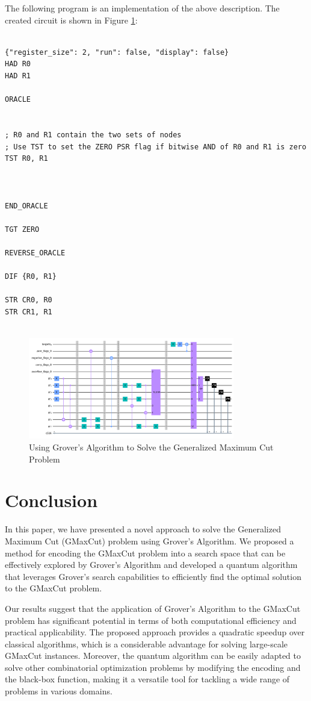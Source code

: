 The following program is an implementation of the above description. The created circuit is shown in Figure \ref{fig:Generalized_Maximum_Cut}:

\begin{lstlisting}

{"register_size": 2, "run": false, "display": false}
HAD R0
HAD R1

ORACLE


; R0 and R1 contain the two sets of nodes
; Use TST to set the ZERO PSR flag if bitwise AND of R0 and R1 is zero
TST R0, R1



END_ORACLE

TGT ZERO

REVERSE_ORACLE

DIF {R0, R1}

STR CR0, R0
STR CR1, R1


\end{lstlisting}

\begin{figure}[htp]
    \centering
    \includegraphics[width=9cm]{Figures/Generalized_Maximum_Cut_circuit.png}
    \caption{Using Grover's Algorithm to Solve the Generalized Maximum Cut Problem}
    \label{fig:Generalized_Maximum_Cut}
\end{figure}

\section{Conclusion}

In this paper, we have presented a novel approach to solve the Generalized Maximum Cut (GMaxCut) problem using Grover's Algorithm. We proposed a method for encoding the GMaxCut problem into a search space that can be effectively explored by Grover's Algorithm and developed a quantum algorithm that leverages Grover's search capabilities to efficiently find the optimal solution to the GMaxCut problem.

Our results suggest that the application of Grover's Algorithm to the GMaxCut problem has significant potential in terms of both computational efficiency and practical applicability. The proposed approach provides a quadratic speedup over classical algorithms, which is a considerable advantage for solving large-scale GMaxCut instances. Moreover, the quantum algorithm can be easily adapted to solve other combinatorial optimization problems by modifying the encoding and the black-box function, making it a versatile tool for tackling a wide range of problems in various domains.

